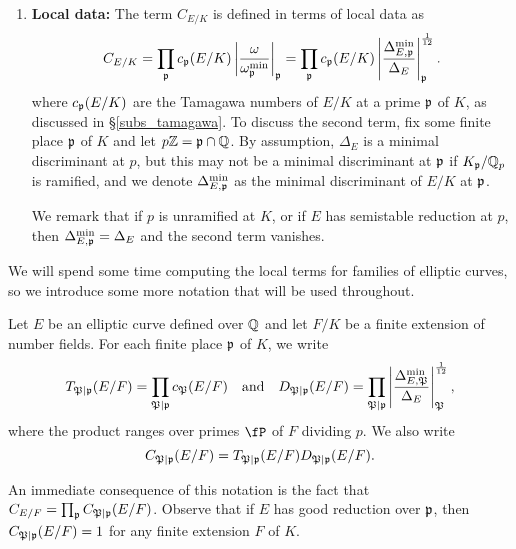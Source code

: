 \begin{enumerate}
    \item \textbf{Local data:} The term $C_{E/K}$ is defined in terms of local data as 
    \begin{equation}\label{fudge-factor}
    C_{E/K}=\prod_{\mathfrak{p}}c_{\mathfrak{p}}(E/K)\left|\frac{\omega}{\omega_{\mathfrak{p}}^{\min}}\right|_{\mathfrak{p}}=\prod_{\mathfrak{p}}c_{\mathfrak{p}}(E/K)\left|\frac{\Delta_{E,\mathfrak{p}}^{\min}}{\Delta_E}\right|_{\mathfrak{p}}^{\frac{1}{12}}.
    \end{equation}
    where $c_{\mathfrak{p}}(E/K)$ are the Tamagawa numbers of $E/K$ at a prime $\mathfrak{p}$ of $K$, as discussed in \S\ref*{subs_tamagawa}. To discuss the second term, fix some finite place $\mathfrak{p}$ of $K$ and let $p\mathbb{Z}=\mathfrak{p}\cap\mathbb{Q}$. By assumption, $\Delta_E$ is a minimal discriminant at $p$, but this may not be a minimal discriminant at $\mathfrak{p}$ if $K_{\mathfrak{p}}/\mathbb{Q}_p$ is ramified, and we denote $\Delta_{E,\mathfrak{p}}^{\min}$ as the minimal discriminant of $E/K$ at $\mathfrak{p}$. 
    
    We remark that if $p$ is unramified at $K$, or if $E$ has semistable reduction at $p$, then $\Delta_{E,\mathfrak{p}}^{\min}=\Delta_E$ and the second term vanishes. 
\end{enumerate}

We will spend some time computing the local terms for families of elliptic curves, so we introduce some more notation that will be used throughout. 

\begin{notation}\label{not_contr}
    Let $E$ be an elliptic curve defined over $\mathbb{Q}$ and let $F/K$ be a finite extension of number fields. For each finite place $\mathfrak{p}$ of $K$, we write 
    $$T_{\mathfrak{P}\mid\mathfrak{p}}(E/F)=\prod_{\mathfrak{P}\mid\mathfrak{p}}c_\mathfrak{P}(E/F)\quad\text{and}\quad D_{\mathfrak{P}\mid\mathfrak{p}}(E/F)=\prod_{\mathfrak{P}\mid\mathfrak{p}}\left|\frac{\Delta_{E,\mathfrak{P}}^{\min}}{\Delta_E}\right|_\mathfrak{P}^{\frac{1}{12}},$$
    where the product ranges over primes $\fP$ of $F$ dividing $p$. We also write 
    $$C_{\mathfrak{P}\mid \mathfrak{p}}(E/F)=T_{\mathfrak{P}\mid \mathfrak{p}}(E/F)D_{\mathfrak{P}\mid \mathfrak{p}}(E/F).$$
\end{notation}

An immediate consequence of this notation is the fact that $C_{E/F}=\prod_{\mathfrak{p}}C_{\mathfrak{P}\mid \mathfrak{p}}(E / F)$.
Observe that if $E$ has good reduction over $\mathfrak{p}$, then $C_{\mathfrak{P}\mid\mathfrak{p}}(E/F)=1$ for any finite extension $F$ of $K$. 


